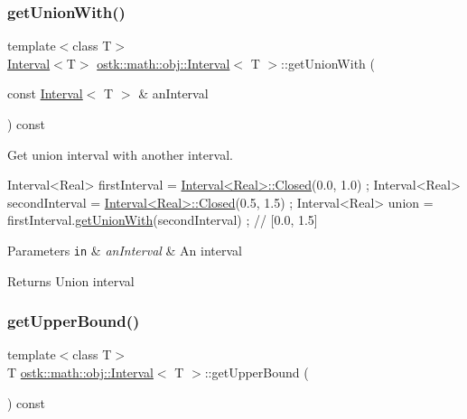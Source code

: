 \subsubsection{\texorpdfstring{get\+Union\+With()}{getUnionWith()}}
{\footnotesize\ttfamily template$<$class T$>$ \\
\hyperlink{classostk_1_1math_1_1obj_1_1_interval}{Interval}$<$T$>$ \hyperlink{classostk_1_1math_1_1obj_1_1_interval}{ostk\+::math\+::obj\+::\+Interval}$<$ T $>$\+::get\+Union\+With (\begin{DoxyParamCaption}\item[{const \hyperlink{classostk_1_1math_1_1obj_1_1_interval}{Interval}$<$ T $>$ \&}]{an\+Interval }\end{DoxyParamCaption}) const}



Get union interval with another interval. 


\begin{DoxyCode}
Interval<Real> firstInterval = \hyperlink{classostk_1_1math_1_1obj_1_1_interval_a48e9f436e8994c49026a1ecd503bc190}{Interval<Real>::Closed}(0.0, 1.0) ;
Interval<Real> secondInterval = \hyperlink{classostk_1_1math_1_1obj_1_1_interval_a48e9f436e8994c49026a1ecd503bc190}{Interval<Real>::Closed}(0.5, 1.5) ;
Interval<Real> \textcolor{keyword}{union }= firstInterval.\hyperlink{classostk_1_1math_1_1obj_1_1_interval_a3ce772da90be0c38f8357e1f24850cb5}{getUnionWith}(secondInterval) ; \textcolor{comment}{// [0.0, 1.5]}
\end{DoxyCode}



\begin{DoxyParams}[1]{Parameters}
\mbox{\tt in}  & {\em an\+Interval} & An interval \\
\hline
\end{DoxyParams}
\begin{DoxyReturn}{Returns}
Union interval 
\end{DoxyReturn}
\mbox{\label{classostk_1_1math_1_1obj_1_1_interval_a0cb57adfc1eea38a490c0c822f49602f}} 
\subsubsection{\texorpdfstring{get\+Upper\+Bound()}{getUpperBound()}}
{\footnotesize\ttfamily template$<$class T$>$ \\
T \hyperlink{classostk_1_1math_1_1obj_1_1_interval}{ostk\+::math\+::obj\+::\+Interval}$<$ T $>$\+::get\+Upper\+Bound (\begin{DoxyParamCaption}{ }\end{DoxyParamCaption}) const}



